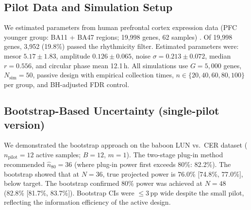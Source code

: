 %
%
%


\subsection*{Pilot Data and Simulation Setup}

We estimated parameters from human prefrontal cortex expression data (PFC younger group: BA11 + BA47 regions; 19,998 genes, 62 samples) \citep{chen2016aging}. Of 19,998 genes, 3,952 (19.8\%) passed the rhythmicity filter. Estimated parameters were: mesor $5.17 \pm 1.83$, amplitude $0.126 \pm 0.065$, noise $\sigma = 0.213 \pm 0.072$, median $r = 0.556$, and circular phase mean 12.1\,h. All simulations use $G = 5{,}000$ genes, $N_{\text{sim}} = 50$, passive design with empirical collection times, $n \in \{20, 40, 60, 80, 100\}$ per group, and BH-adjusted FDR control.

\subsection*{Bootstrap-Based Uncertainty (single-pilot version)}

We demonstrated the bootstrap approach on the baboon LUN vs.\ CER dataset
($n_{\text{pilot}} = 12$ active samples; $B = 12$, $m = 1$). The two-stage
plug-in method recommended $\hat{n}_{80} = 36$ (where plug-in power first
exceeds 80\%: 82.2\%). The bootstrap showed that at $N = 36$, true projected
power is 76.0\% [74.8\%, 77.0\%], below target. The bootstrap confirmed 80\%
power was achieved at $N = 48$ (82.8\% [81.7\%, 83.7\%]). Bootstrap CIs were
$\leq 3$\,pp wide despite the small pilot, reflecting the information
efficiency of the active design.

